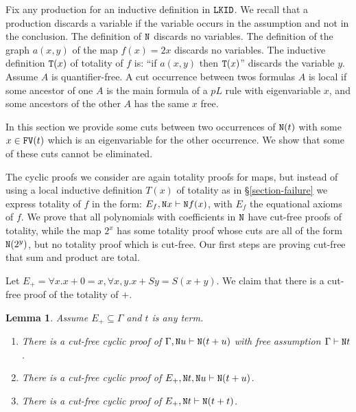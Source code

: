 \documentclass[a4paper,12pt]{article}
\newtheorem{lemma}[theorem]{Lemma}
\newcommand{\Nat}               { {\tt N}  }
\newcommand{\FV}              { {\tt FV} }
\newcommand{\Tot}           { {\tt T} }
\newcommand{\LKID} { {\tt LKID} }
\begin{document}
Fix any production for an inductive definition in $\LKID$. We recall that a production discards a variable if the variable occurs in the assumption and not in the conclusion. The definition of $\Nat$ discards no variables. The definition of the graph $a(x,y)$ of the map $f(x)=2x$ discards no variables. The inductive definition $\Tot(x)$ of totality of $f$ is: ``if $a(x,y)$ then $\Tot(x)$'' discards the variable $y$. Assume $A$ is quantifier-free. A cut occurrence between twos formulas $A$ is local if some ancestor of one $A$ is the main formula of a $p L$ rule with eigenvariable $x$, and some ancestors of the other $A$ has the same $x$ free.

In this section we provide some cuts between two occurrences of $\Nat(t)$ with some $x \in \FV(t)$ which is an eigenvariable for the other occurrence. We show that some of these cuts cannot be eliminated.

The cyclic proofs we consider are again totality proofs for maps, but instead of using a local inductive definition $T(x)$ of totality as in \S \ref{section-failure} we express totality of $f$ in the form: $E_f, \Nat x \vdash \Nat f(x)$, with $E_f$ the equational axioms of $f$.  We prove that all polynomials with coefficients in $\Nat$ have cut-free proofs of totality, while the map $2^x$ has some totality proof whose cuts are all of the form $\Nat(2^y)$, but no totality proof which is cut-free. Our first steps are proving cut-free that sum and product are total.

Let $E_+ = \forall x.x+0=x, \forall x,y.x+Sy=S(x+y)$. We claim that there is a cut-free proof of the totality of $+$.

\begin{lemma}
\label{lemma-sum-total}
Assume $E_+ \subseteq \Gamma$ and $t$ is any term.
\begin{enumerate}
\item
There is a cut-free cyclic proof of $\Gamma, \Nat u \vdash \Nat (t+u)$ with free assumption $\Gamma \vdash \Nat t$.
\item
There is a cut-free cyclic proof of $E_+, \Nat t, \Nat u \vdash \Nat (t+u)$. 
\item
There is a cut-free cyclic proof of $E_+, \Nat t \vdash \Nat (t+t)$. 
\end{enumerate}
\end{lemma}
\end{document}
